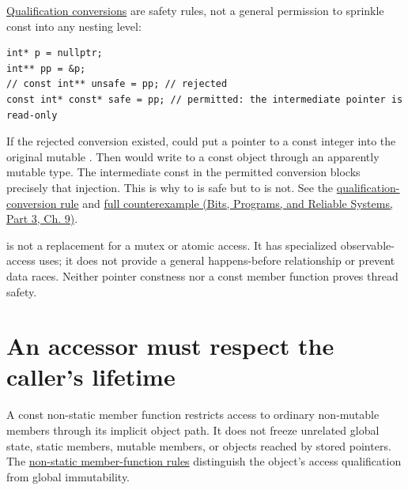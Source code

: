 \hyperref[appendix-5e1a7561cd98]{Qualification conversions} are safety rules, not a general permission to sprinkle const into any nesting level:

\begin{verbatim}
int* p = nullptr;
int** pp = &p;
// const int** unsafe = pp; // rejected
const int* const* safe = pp; // permitted: the intermediate pointer is read-only
\end{verbatim}

If the rejected conversion existed,  could put a pointer to a const integer into the original mutable . Then  would write to a const object through an apparently mutable type. The intermediate const in the permitted conversion blocks precisely that injection. This is why  to  is safe but  to  is not. See the \href{https://eel.is/c++draft/conv.qual}{qualification-conversion rule} and \href{../01-Bits-Programs-and-Reliable-Systems-P03/main.pdf\#01-foundations-i-ch011-c---qualification-safety-and-borrow-intervals}{full counterexample (Bits, Programs, and Reliable Systems, Part 3, Ch. 9)}.

 is not a replacement for a mutex or atomic access. It has specialized observable-access uses; it does not provide a general happens-before relationship or prevent data races. Neither pointer constness nor a const member function proves thread safety.

\section{An accessor must respect the caller's lifetime}\label{01-foundations-i-ch003-an-accessor-must-respect-the-callers-lifetime}

\hypertarget{01-foundations-i-ch003-an-accessor-must-respect-the-callers-lifetime}{}

A const non-static member function restricts access to ordinary non-mutable members through its implicit object path. It does not freeze unrelated global state, static members, mutable members, or objects reached by stored pointers. The \href{https://eel.is/c++draft/class.mfct.non.static}{non-static member-function rules} distinguish the object's access qualification from global immutability.

